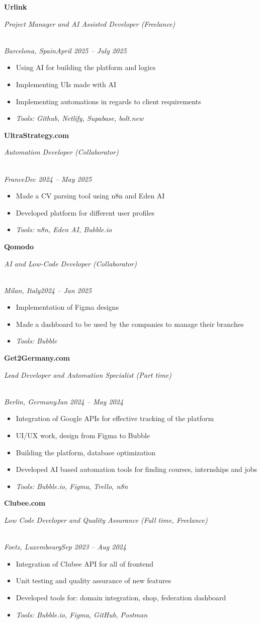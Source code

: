 \documentclass[a4paper,10pt]{article}
\newcommand{\role}[4]{\vspace{3pt}\noindent\hspace{0.6em}\parbox[t]{0.38\textwidth}{\raggedright\textbf{#1}}\hfill\parbox[t]{0.58\textwidth}{\raggedleft\textit{#2}}\\{\textit{#3}\hfill\textit{#4}}\vspace{1pt}}
\begin{document}
\role{Urlink}{Project Manager and AI Assisted Developer (Freelance)}{Barcelona, Spain}{April 2025 -- July 2025}
\begin{itemize}
\item Using AI for building the platform and logics
\item Implementing UIs made with AI
\item Implementing automations in regards to client requirements
\item \textit{Tools: Github, Netlify, Supabase, bolt.new}
\end{itemize}

\role{UltraStrategy.com}{Automation Developer (Collaborator)}{France}{Dec 2024 -- May 2025}
\begin{itemize}
\item Made a CV parsing tool using n8n and Eden AI
\item Developed platform for different user profiles
\item \textit{Tools: n8n, Eden AI, Bubble.io}
\end{itemize}

\role{Qomodo}{AI and Low-Code Developer (Collaborator)}{Milan, Italy}{2024 -- Jan 2025}
\begin{itemize}
\item Implementation of Figma designs
\item Made a dashboard to be used by the companies to manage their branches
\item \textit{Tools: Bubble}
\end{itemize}

\role{Get2Germany.com}{Lead Developer and Automation Specialist (Part time)}{Berlin, Germany}{Jan 2024 -- May 2024}
\begin{itemize}
\item Integration of Google APIs for effective tracking of the platform
\item UI/UX work, design from Figma to Bubble
\item Building the platform, database optimization
\item Developed AI based automation tools for finding courses, internships and jobs
\item \textit{Tools: Bubble.io, Figma, Trello, n8n}
\end{itemize}

\role{Clubee.com}{Low Code Developer and Quality Assurance (Full time, Freelance)}{Foetz, Luxembourg}{Sep 2023 -- Aug 2024}
\begin{itemize}
\item Integration of Clubee API for all of frontend
\item Unit testing and quality assurance of new features
\item Developed tools for: domain integration, shop, federation dashboard
\item \textit{Tools: Bubble.io, Figma, GitHub, Postman}
\end{itemize}
\end{document}
